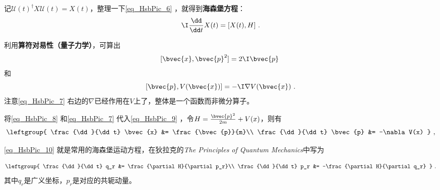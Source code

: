 记$\mathcal{U}(t)^\dagger X \mathcal{U}(t)=X(t)$，整理一下\autoref{eq_HsbPic_6} ，就得到\textbf{海森堡方程}：
\begin{equation}\label{eq_HsbPic_9}
\I\frac{\dd}{\dd t}X(t) = [X(t), H]~.
\end{equation}


利用\textbf{算符对易性（量子力学）}，可算出
\begin{equation}\label{eq_HsbPic_8}
    [\bvec{x}, \bvec{p}^2] = 2\I \bvec{p}~
\end{equation}
和
\begin{equation}\label{eq_HsbPic_7}
[\bvec{p}, V(\bvec{x})] = -\I\nabla V(\bvec{x})~.
\end{equation}
注意\autoref{eq_HsbPic_7} 右边的$\nabla$已经作用在$V$上了，整体是一个函数而非微分算子。

将\autoref{eq_HsbPic_8} 和\autoref{eq_HsbPic_7} 代入\autoref{eq_HsbPic_9} ，令$H=\frac{\bvec{p}^2}{2m}+V(x)$，则有
\begin{equation}\label{eq_HsbPic_10}
\leftgroup{
    \frac{\dd}{\dd t} \bvec{x} &= \frac{\bvec{p}}{m}\\
    \frac{\dd}{\dd t} \bvec{p} &= -\nabla V(x)
}~,
\end{equation}


\autoref{eq_HsbPic_10} 就是常用的海森堡运动方程，在狄拉克的\textsl{The Principles of Quantum Mechanics}中写为

\begin{equation}\label{eq_HsbPic_11}
\leftgroup{
    \frac{\dd}{\dd t} q_r &= \frac{\partial H}{\partial p_r}\\
    \frac{\dd}{\dd t} p_r &= -\frac{\partial H}{\partial q_r} 
}~.
\end{equation}
其中$q_r$是广义坐标，$p_r$是对应的共轭动量。












